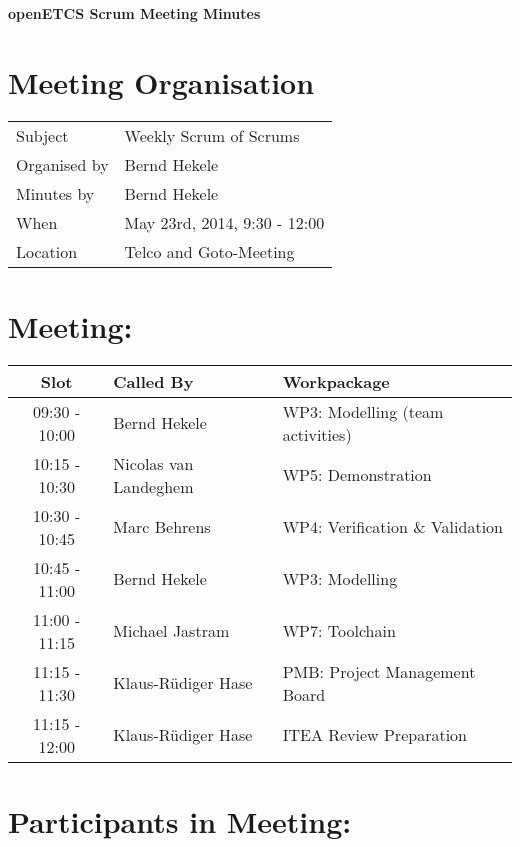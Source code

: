 \documentclass[a4paper, 11pt]{article}
\begin{document}
{\begin{center}\huge\bf openETCS Scrum Meeting Minutes\end{center}}
\section{Meeting Organisation}

\renewcommand{\arraystretch}{1.5}
\begin{supertabular}{m{.2\textwidth}m{.8\textwidth}}
Subject & Weekly Scrum of Scrums\\
Organised by & Bernd Hekele\\
Minutes by & Bernd Hekele\\
When & May 23rd, 2014, 9:30 - 12:00\\
Location & Telco and Goto-Meeting\\
\end{supertabular}

\renewcommand{\arraystretch}{1.0}
\section{Meeting:}

\begin{tabular}{|c|l|l|}
\hline
\textbf{Slot} &  \textbf{Called By} & \textbf{Workpackage} \\
\hline  
09:30 - 10:00 & Bernd Hekele & WP3: Modelling (team activities)\\\hline
10:15 - 10:30 & Nicolas van Landeghem & WP5: Demonstration \\\hline  
10:30 - 10:45 & Marc Behrens & WP4: Verification \& Validation \\\hline  
10:45 - 11:00 & Bernd Hekele & WP3: Modelling \\\hline  
11:00 - 11:15 & Michael Jastram & WP7: Toolchain \\\hline
11:15 - 11:30 & Klaus-R\"udiger Hase & PMB: Project Management Board \\\hline  
11:15 - 12:00 & Klaus-R\"udiger Hase & ITEA Review Preparation \\\hline  
\end{tabular}

\section{Participants in Meeting:}
\end{document}
